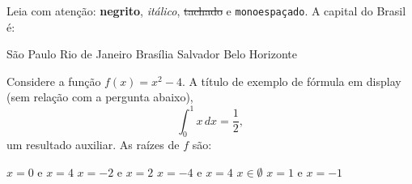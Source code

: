 %
%

%
%
%

\setcounter{question}{45}
\question Leia com atenção: \textbf{negrito}, \emph{itálico}, \sout{tachado} e
\texttt{monoespaçado}. A capital do Brasil é:
\begin{choices}
  \choice São Paulo
  \choice Rio de Janeiro
  \CorrectChoice Brasília
  \choice Salvador
  \choice Belo Horizonte
\end{choices}

\setcounter{question}{46}
\question Considere a função $f(x) = x^2 - 4$. A título de exemplo de fórmula
em display (sem relação com a pergunta abaixo),
$$\int_{0}^{1} x \, dx = \frac{1}{2},$$
um resultado auxiliar. As raízes de $f$ são:
\begin{choices}
  \choice $x = 0$ e $x = 4$
  \CorrectChoice $x = -2$ e $x = 2$
  \choice $x = -4$ e $x = 4$
  \choice $x \in \emptyset$
  \choice $x = 1$ e $x = -1$
\end{choices}


